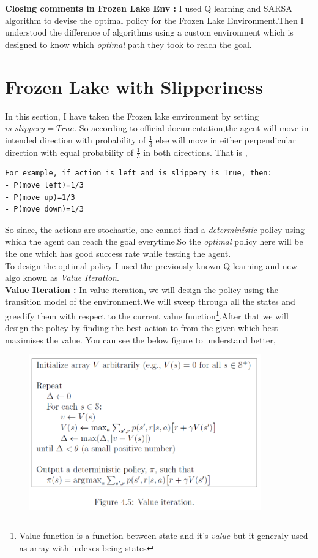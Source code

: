 \documentclass[journal,12pt,onecolumn]{IEEEtran}
\theoremstyle{remark}
\numberwithin{equation}{section}
\begin{document}
    \textbf{Closing comments in Frozen Lake Env :}
      I used Q learning and SARSA algorithm to devise the optimal policy for the Frozen Lake Environment.Then I understood the difference of algorithms using a custom environment which is designed to know which \textit{optimal} path they took to reach the goal.

 \section{Frozen Lake with Slipperiness}
 In this section, I have taken the Frozen lake environment by setting $\textit{is\_slippery} = True$. So according to official documentation,the agent will move in intended direction with probability of $\frac{1}{3}$ else will move in either perpendicular direction with equal probability of $\frac{1}{3}$ in both directions. That is ,
    \begin{lstlisting}
For example, if action is left and is_slippery is True, then:
- P(move left)=1/3
- P(move up)=1/3
- P(move down)=1/3
    \end{lstlisting}
    So since, the actions are stochastic, one cannot find a \emph{deterministic} policy using which the agent can reach the goal everytime.So the \emph{optimal} policy here will be the one which has good success rate while testing the agent.\\
    To design the optimal policy I used the previously known Q learning and new algo known as \textit{Value Iteration}.\\
    \textbf{Value Iteration :} In value iteration, we will design the policy using the transition model of the environment.We will sweep through all the states and greedify them with respect to the current value function\footnote{ Value function is a function between state and it's \textit{value} but it generaly used as array with indexes being states}.After that we will design the policy by finding the best action to from the given which best maximises the value. You can see the below figure to understand better,  
    \begin{figure}[ht]
		\centering
		\includegraphics[width = 10cm]{Figs/val_ite.png}
		\caption{}
		\label{val-iter}
	\end{figure}
\end{document}
